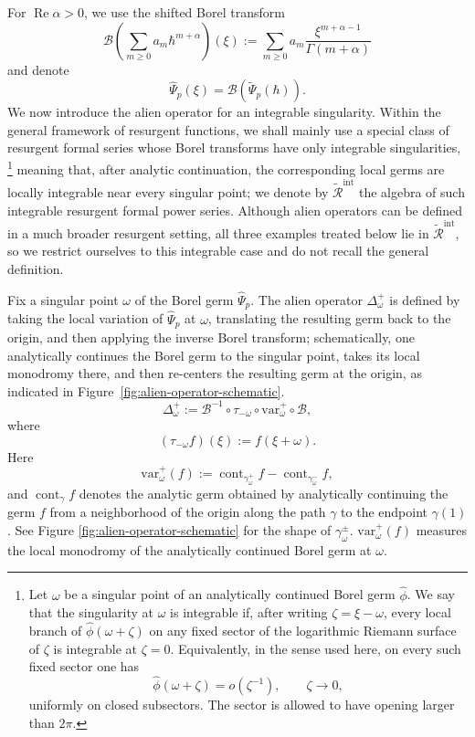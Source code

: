 \documentclass[11pt]{amsart}
\DeclareMathOperator{\cont}{cont}
\theoremstyle{plain}
\newcommand{\re}{\operatorname{Re}}
\begin{document}
For \(\re\alpha>0\), we use the shifted Borel transform
\begin{equation}\label{Boreltransform}
\mathcal B
\left(
\sum_{m\ge0} a_m \hbar^{m+\alpha}
\right)(\xi)
:=
\sum_{m\ge0} a_m
\frac{\xi^{m+\alpha-1}}{\Gamma(m+\alpha)}
\end{equation}
and denote
$$
\widehat\Psi_p(\xi)=\mathcal B(\widetilde\Psi_p(\hbar)).
$$
We now introduce the alien operator for an integrable singularity. 
Within the general framework of resurgent functions, we shall mainly use a special class of resurgent formal series whose Borel transforms have only integrable singularities,
\footnote{
Let \(\omega\) be a singular point of an analytically continued Borel germ
\(\widehat\phi\).  We say that the singularity at \(\omega\) is integrable if,
after writing \(\zeta=\xi-\omega\), every local branch of
\(\widehat\phi(\omega+\zeta)\) on any fixed sector of the logarithmic Riemann
surface of \(\zeta\) is integrable at \(\zeta=0\).  Equivalently, in the sense
used here, on every such fixed sector one has 
\[
\widehat\phi(\omega+\zeta)=o(\zeta^{-1}),
\qquad \zeta\to0,\] uniformly on closed subsectors.  The sector is allowed to have opening larger
than \(2\pi\).
}
meaning that, after analytic continuation, the corresponding local germs are
locally integrable near every singular point; we denote by
\(\widetilde{\mathcal R}^{\mathrm{int}}\) the algebra of such integrable
resurgent formal power series.
Although alien operators can be defined in a much broader resurgent setting,
all three examples treated below lie in
\(\widetilde{\mathcal R}^{\mathrm{int}}\), so we restrict ourselves to this
integrable case and do not recall the general definition.

Fix a singular point \(\omega\) of the Borel germ \(\widehat\Psi_p\). The alien operator \(\Delta_\omega^{+}\) is defined by taking the local variation of \(\widehat\Psi_p\) at \(\omega\), translating the resulting germ back to the origin, and then applying the inverse Borel transform; schematically, one analytically continues the Borel germ to the singular point, takes its local monodromy there, and then re-centers the resulting germ at the origin, as indicated in Figure~\ref{fig:alien-operator-schematic}.
\begin{equation*}
\Delta_\omega^{+}:=\mathcal B^{-1}\circ \tau_{-\omega}\circ \mathrm{var}_\omega^{+}\circ \mathcal B,
\end{equation*}
where
\begin{equation*}
(\tau_{-\omega}f)(\xi):=f(\xi+\omega).
\end{equation*}
Here
\begin{equation*}
\mathrm{var}_\omega^{+}(f):=\cont_{\gamma_\omega^{+}}f-\cont_{\gamma_\omega^{-}}f,
\end{equation*}
and \(\cont_{\gamma}f\) denotes the analytic germ obtained by analytically
continuing the germ \(f\) from a neighborhood of the origin along the path
\(\gamma\) to the endpoint \(\gamma(1)\). See Figure \ref{fig:alien-operator-schematic} for the shape of $\gamma_\omega^{\pm}$. \(\mathrm{var}_\omega^+(f)\) measures the local
monodromy of the analytically continued Borel germ at \(\omega\).
\end{document}
